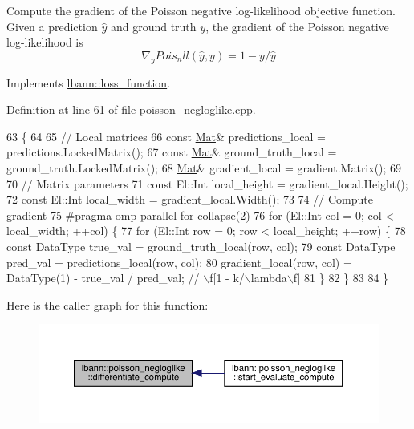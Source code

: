 Compute the gradient of the Poisson negative log-\/likelihood objective function. Given a prediction $\hat{y}$ and ground truth $y$, the gradient of the Poisson negative log-\/likelihood is \[ \nabla_y Pois_nll(\hat{y},y) = 1 - y/\hat{y} \] 

Implements \hyperlink{classlbann_1_1loss__function_aefccc2b4f5a02664002d12630cf369e7}{lbann\+::loss\+\_\+function}.



Definition at line 61 of file poisson\+\_\+negloglike.\+cpp.


\begin{DoxyCode}
63                                                                      \{
64 
65   \textcolor{comment}{// Local matrices}
66   \textcolor{keyword}{const} \hyperlink{base_8hpp_a68f11fdc31b62516cb310831bbe54d73}{Mat}& predictions\_local = predictions.LockedMatrix();
67   \textcolor{keyword}{const} \hyperlink{base_8hpp_a68f11fdc31b62516cb310831bbe54d73}{Mat}& ground\_truth\_local = ground\_truth.LockedMatrix();
68   \hyperlink{base_8hpp_a68f11fdc31b62516cb310831bbe54d73}{Mat}& gradient\_local = gradient.Matrix();
69 
70   \textcolor{comment}{// Matrix parameters}
71   \textcolor{keyword}{const} El::Int local\_height = gradient\_local.Height();
72   \textcolor{keyword}{const} El::Int local\_width = gradient\_local.Width();
73 
74   \textcolor{comment}{// Compute gradient}
75 \textcolor{preprocessor}{  #pragma omp parallel for collapse(2)}
76   \textcolor{keywordflow}{for} (El::Int col = 0; col < local\_width; ++col) \{
77     \textcolor{keywordflow}{for} (El::Int row = 0; row < local\_height; ++row) \{
78       \textcolor{keyword}{const} DataType true\_val = ground\_truth\_local(row, col);
79       \textcolor{keyword}{const} DataType pred\_val = predictions\_local(row, col);
80       gradient\_local(row, col) = DataType(1) - true\_val / pred\_val; \textcolor{comment}{// \(\backslash\)f[1 - k/\(\backslash\)lambda\(\backslash\)f]}
81     \}
82   \}
83 
84 \}
\end{DoxyCode}
Here is the caller graph for this function\+:\nopagebreak
\begin{figure}[H]
\begin{center}
\leavevmode
\includegraphics[width=350pt]{classlbann_1_1poisson__negloglike_a9b6e6632bb6424551b38b8748ff64edd_icgraph}
\end{center}
\end{figure}
\mbox{\label{classlbann_1_1poisson__negloglike_a67c3cb239905fa9ee57369dddbbe76ed}} 
